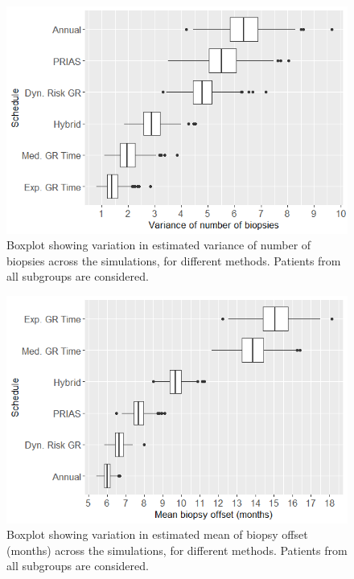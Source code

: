 \begin{figure}[!htb]
\centerline{\includegraphics[width=\columnwidth]{images/sim_study/nbVarBoxPlot_all.png}}
\caption{Boxplot showing variation in estimated variance of number of biopsies across the simulations, for different methods. Patients from all subgroups are considered.}
\label{fig : nbVarBoxPlot_all}
\end{figure}

\begin{figure}[!htb]
\centerline{\includegraphics[width=\columnwidth]{images/sim_study/offsetMeanBoxPlot_all.png}}
\caption{Boxplot showing variation in estimated mean of biopsy offset (months) across the simulations, for different methods. Patients from all subgroups are considered.}
\label{fig : offsetMeanBoxPlot_all}
\end{figure}

